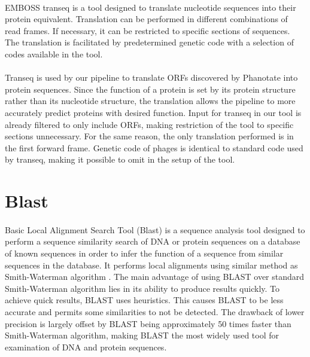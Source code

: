 \paragraph*{}
EMBOSS transeq\cite{madeira2022search} is a tool designed to translate nucleotide sequences into their protein equivalent. Translation can be performed in different combinations of read frames. If necessary, it can be restricted to specific sections of sequences. The translation is facilitated by predetermined genetic code with a selection of codes available in the tool.
\paragraph*{}
Transeq is used by our pipeline to translate ORFs discovered by Phanotate into protein sequences. Since the function of a protein is set by its protein structure rather than its nucleotide structure, the translation allows the pipeline to more accurately predict proteins with desired function. Input for transeq in our tool is already filtered to only include ORFs, making restriction of the tool to specific sections unnecessary. For the same reason, the only translation performed is in the first forward frame. Genetic code of phages is identical to standard code used by transeq, making it possible to omit in the setup of the tool.

\section{Blast}
\paragraph*{}
Basic Local Alignment Search Tool (Blast)\cite{altschul1990basic} is a sequence analysis tool designed to perform a sequence similarity search of DNA or protein sequences on a database of known sequences in order to infer the function of a sequence from similar sequences in the database. It performs local alignments using similar method as Smith-Waterman algorithm \cite{smith1981identification}. The main advantage of using BLAST over standard Smith-Waterman algorithm lies in its ability to produce results quickly. To achieve quick results, BLAST uses heuristics. This causes BLAST to be less accurate and permits some similarities to not be detected. The drawback of lower precision is largely offset by BLAST being approximately 50 times faster than Smith-Waterman algorithm, making BLAST the most widely used tool for examination of DNA and protein sequences.
